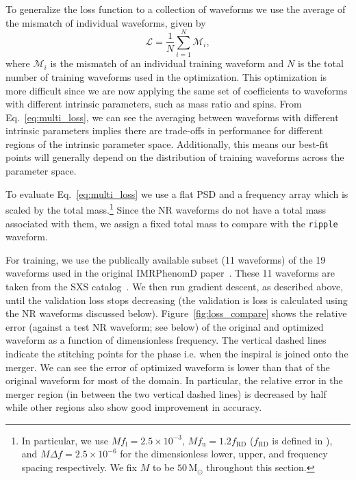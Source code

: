 \documentclass[twocolumn]{aastex631}
\newcommand{\ripple}{\texttt{ripple}\xspace}
\begin{document}
To generalize the loss function to a collection of waveforms we use the average of the mismatch of individual waveforms, given by
\begin{equation}
	\mathcal{L}=\frac{1}{N}\sum_{i=1}^{N}\mathcal{M}_i,
    \label{eq:multi_loss}
\end{equation}
where $\mathcal{M}_i$ is the mismatch of an individual training waveform and $N$ is the total number of training waveforms used in the optimization.
This optimization is more difficult since we are now applying the same set of coefficients to waveforms with different intrinsic parameters, such as mass ratio and spins. 
From Eq.~\eqref{eq:multi_loss}, we can see the averaging between waveforms with different intrinsic parameters implies there are trade-offs in performance for different regions of the intrinsic parameter space. 
Additionally, this means our best-fit points will generally depend on the distribution of training waveforms across the parameter space.

To evaluate Eq.~\eqref{eq:multi_loss} we use a flat PSD and a frequency array which is scaled by the total mass.\footnote{
    In particular, we use $M f_{\mathrm{l}} = 2.5 \times 10^{-3}$, $M f_{\mathrm{u}} = 1.2 f_{\textrm{RD}}$ ($f_{\textrm{RD}}$ is defined in \cite{Khan:2015jqa}), and $M\Delta f = 2.5 \times 10^{-6}$ for the dimensionless lower, upper, and frequency spacing respectively. We fix $M$ to be $50\,\mathrm{M}_\odot$ throughout this section.
}
Since the NR waveforms do not have a total mass associated with them, we assign a fixed total mass to compare with the \ripple waveform.

For training, we use the publically available subset (11 waveforms) of the 19 waveforms used in the original IMRPhenomD paper~\citep{Khan:2015jqa}. 
These 11 waveforms are taken from the SXS catalog~\citep{Boyle:2019kee}.
We then run gradient descent, as described above, until the validation loss stops decreasing (the validation is loss is calculated using the NR waveforms discussed below). 
Figure~\ref{fig:loss_compare} shows the relative error (against a test NR waveform; see below) of the original and optimized waveform as a function of dimensionless frequency.
The vertical dashed lines indicate the stitching points for the phase i.e. when the inspiral is joined onto the merger.
We can see the error of optimized waveform is lower than that of the original waveform for most of the domain.
In particular, the relative error in the merger region (in between the two vertical dashed lines) is decreased by half while other regions also show good improvement in accuracy. 
\end{document}
